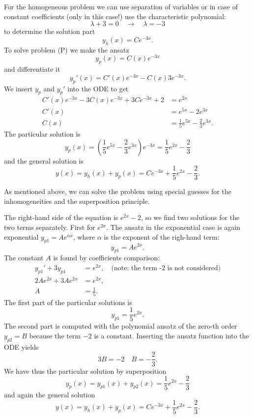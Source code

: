{\begin{itemize}
\begin{iii}
For the homogeneous problem we can use separation of variables or in case of constant coefficients (only in this case!) use the characteristic polynomial:
$$
\lambda + 3 = 0 \quad \rightarrow \quad \lambda = -3
$$
to determine the solution part
$$
y_h(x) = C e^{-3x}.
$$
To solve problem (P) we make the ansatz
$$
y_p(x) = C(x) e^{-3x}
$$
and differentiate it
$$
y_p'(x) = C'(x) e^{-3x} - C(x) 3 e^{-3x}.
$$
We insert $y_p$ and $y_p'$ into the ODE to get
\begin{align*}
C'(x)e^{-3x} -3C(x) e^{-3x} +3Ce^{-3x} +2 &= e^{2x}\\
C'(x)&= e^{5x}-2e^{3x}\\
C(x) &= \frac{1}{5}e^{5x} -\frac{2}{3}e^{3x}.
\end{align*}
The particular solution is
$$
y_p(x) = \left( \frac{1}{5}e^{5x} -\frac{2}{3}e^{3x} \right) e^{-3x} = \frac{1}{5}e^{2x}  -\frac{2}{3}
$$
and the general solution is
$$
y(x) = y_h(x) + y_p(x) = C e^{-3x} +  \frac{1}{5}e^{2x}  -\frac{2}{3}.
$$

As mentioned above, we can solve the problem using special guesses for the inhomogeneities and the superposition principle.

The right-hand side of the equation is $e^{2x} -2$, so we find two solutions for the two terms separately. First for $e^{2x}$. The ansatz in the exponential case is again exponential $y_{p1}=Ae^{\alpha x}$, where $\alpha$ is the exponent of the righ-hand term:
$$
y_{p1} = A e^{2x}.
$$
The constant $A$ is found by coefficients comparison:
\begin{align*}
y_{p1}' +3y_{p1} &= e^{2x}, \quad \text{(note: the term -2 is not considered)}\\
2 A e^{2x} + 3 A e^{2x} &= e^{2x},\\
A &= \frac{1}{5}.
\end{align*}
The first part of the particular solutions is
$$
y_{p1} = \frac{1}{5}e^{2x}.
$$
The second part is computed with the polynomial ansatz of the zero-th order $y_{p2}=B$ because the term $-2$ is a constant. Inserting the ansatz function into the ODE yields
$$
3 B = -2 \quad B=-\frac{2}{3}.
$$
We have thus the particular solution by superposition
$$
y_p(x) = y_{p1}(x) + y_{p2}(x) =  \frac{1}{5}e^{2x} - \frac{2}{3}
$$
and again the general solution
$$
y(x) = y_h(x) + y_p(x) = Ce^{-3x} +  \frac{1}{5}e^{2x} - \frac{2}{3}.
$$
\end{iii}

\end{itemize}
}



